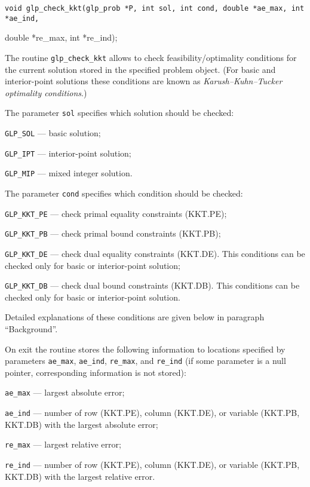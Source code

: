 \synopsis

{\parskip=0pt
\tt void glp\_check\_kkt(glp\_prob *P, int sol, int cond,
double *ae\_max, int *ae\_ind,

\hspace{105pt}double *re\_max, int *re\_ind);}

\description

The routine \verb|glp_check_kkt| allows to check
feasibility/optimality conditions for the current solution stored in
the specified problem object. (For basic and interior-point solutions
these conditions are known as {\it Karush--Kuhn--Tucker optimality
conditions}.)

The parameter \verb|sol| specifies which solution should be checked:

\verb|GLP_SOL| --- basic solution;

\verb|GLP_IPT| --- interior-point solution;

\verb|GLP_MIP| --- mixed integer solution.

The parameter \verb|cond| specifies which condition should be checked:

\verb|GLP_KKT_PE| --- check primal equality constraints (KKT.PE);

\verb|GLP_KKT_PB| --- check primal bound constraints (KKT.PB);

\verb|GLP_KKT_DE| --- check dual equality constraints (KKT.DE). This
conditions can be checked only for basic or interior-point solution;

\verb|GLP_KKT_DB| --- check dual bound constraints (KKT.DB). This
conditions can be checked only for basic or interior-point solution.

Detailed explanations of these conditions are given below in paragraph
``Background''.

On exit the routine stores the following information to locations
specified by parameters \verb|ae_max|, \verb|ae_ind|, \verb|re_max|,
and \verb|re_ind| (if some parameter is a null pointer, corresponding
information is not stored):

\verb|ae_max| --- largest absolute error;

\verb|ae_ind| --- number of row (KKT.PE), column (KKT.DE), or variable
(KKT.PB, KKT.DB) with the largest absolute error;

\verb|re_max| --- largest relative error;

\verb|re_ind| --- number of row (KKT.PE), column (KKT.DE), or variable
(KKT.PB, KKT.DB) with the largest relative error.

